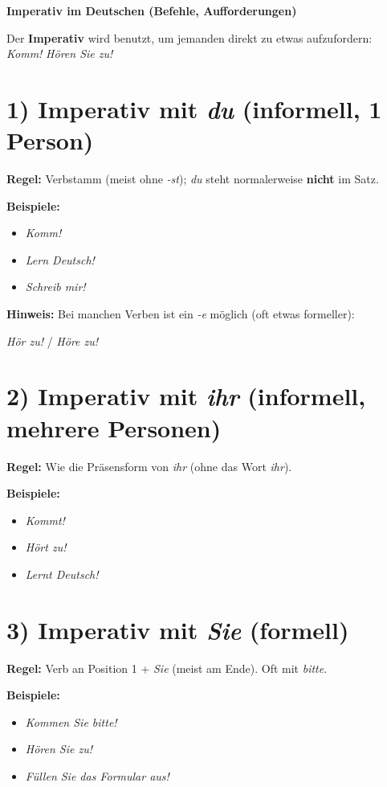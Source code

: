 \documentclass[varwidth,border=10pt]{standalone}
\begin{document}
    
    {\LARGE\bfseries Imperativ im Deutschen (Befehle, Aufforderungen)}\par\vspace{6pt}
    
    Der \textbf{Imperativ} wird benutzt, um jemanden direkt zu etwas aufzufordern:
    \textit{Komm!} \textit{Hören Sie zu!}
    
    \vspace{8pt}
    
    
    \section*{1) Imperativ mit \textit{du} (informell, 1 Person)}
    \textbf{Regel:} Verbstamm (meist ohne \textit{-st}); \textit{du} steht normalerweise
    \textbf{nicht} im Satz.\par
    \textbf{Beispiele:}
    \begin{itemize}
        \item \textit{Komm!}
        \item \textit{Lern Deutsch!}
        \item \textit{Schreib mir!}
    \end{itemize}
    
    \textbf{Hinweis:} Bei manchen Verben ist ein \textit{-e} möglich (oft etwas formeller):\par
    \textit{Hör zu!} / \textit{Höre zu!}
    
    \vspace{6pt}
    
    
    \section*{2) Imperativ mit \textit{ihr} (informell, mehrere Personen)}
    \textbf{Regel:} Wie die Präsensform von \textit{ihr} (ohne das Wort \textit{ihr}).\par
    \textbf{Beispiele:}
    \begin{itemize}
        \item \textit{Kommt!}
        \item \textit{Hört zu!}
        \item \textit{Lernt Deutsch!}
    \end{itemize}
    
    \vspace{6pt}
    
    
    \section*{3) Imperativ mit \textit{Sie} (formell)}
    \textbf{Regel:} Verb an Position 1 + \textit{Sie} (meist am Ende). Oft mit
    \textit{bitte}.\par
    \textbf{Beispiele:}
    \begin{itemize}
        \item \textit{Kommen Sie bitte!}
        \item \textit{Hören Sie zu!}
        \item \textit{Füllen Sie das Formular aus!}
    \end{itemize}
    
\end{document}
